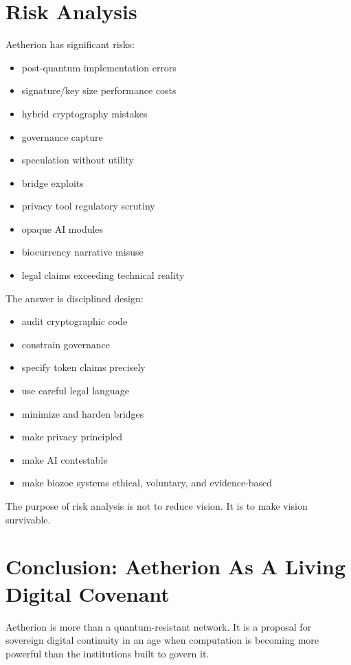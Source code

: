 ﻿\documentclass[12pt]{article}
\begin{document}
\section{Risk Analysis}


Aetherion has significant risks:

\begin{itemize}
  \item post-quantum implementation errors
  \item signature/key size performance costs
  \item hybrid cryptography mistakes
  \item governance capture
  \item speculation without utility
  \item bridge exploits
  \item privacy tool regulatory scrutiny
  \item opaque AI modules
  \item biocurrency narrative misuse
  \item legal claims exceeding technical reality
\end{itemize}

The answer is disciplined design:

\begin{itemize}
  \item audit cryptographic code
  \item constrain governance
  \item specify token claims precisely
  \item use careful legal language
  \item minimize and harden bridges
  \item make privacy principled
  \item make AI contestable
  \item make biozoe systems ethical, voluntary, and evidence-based
\end{itemize}

The purpose of risk analysis is not to reduce vision. It is to make vision survivable.

\section{Conclusion: Aetherion As A Living Digital Covenant}


Aetherion is more than a quantum-resistant network. It is a proposal for sovereign digital continuity in an age when computation is becoming more powerful than the institutions built to govern it.
\end{document}
